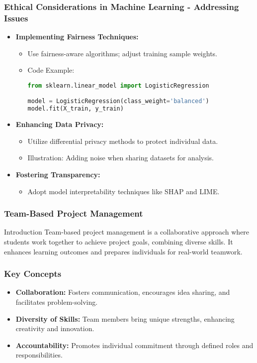 \documentclass[aspectratio=169]{beamer}
\begin{document}
\begin{frame}[fragile]
    \frametitle{Ethical Considerations in Machine Learning - Addressing Issues}
    \begin{itemize}
        \item \textbf{Implementing Fairness Techniques:}
            \begin{itemize}
                \item Use fairness-aware algorithms; adjust training sample weights.
                \item Code Example:
                \begin{lstlisting}[language=Python]
from sklearn.linear_model import LogisticRegression

model = LogisticRegression(class_weight='balanced')
model.fit(X_train, y_train)
                \end{lstlisting}
            \end{itemize}
        
        \item \textbf{Enhancing Data Privacy:}
            \begin{itemize}
                \item Utilize differential privacy methods to protect individual data.
                \item Illustration: Adding noise when sharing datasets for analysis.
            \end{itemize}
        
        \item \textbf{Fostering Transparency:}
            \begin{itemize}
                \item Adopt model interpretability techniques like SHAP and LIME.
            \end{itemize}
    \end{itemize}
\end{frame}

\begin{frame}[fragile]
    \frametitle{Team-Based Project Management}
    \begin{block}{Introduction}
        Team-based project management is a collaborative approach where students work together to achieve project goals, combining diverse skills. It enhances learning outcomes and prepares individuals for real-world teamwork.
    \end{block}
\end{frame}

\begin{frame}[fragile]
    \frametitle{Key Concepts}
    \begin{itemize}
        \item \textbf{Collaboration:} Fosters communication, encourages idea sharing, and facilitates problem-solving.
        \item \textbf{Diversity of Skills:} Team members bring unique strengths, enhancing creativity and innovation.
        \item \textbf{Accountability:} Promotes individual commitment through defined roles and responsibilities.
    \end{itemize}
\end{frame}
\end{document}
